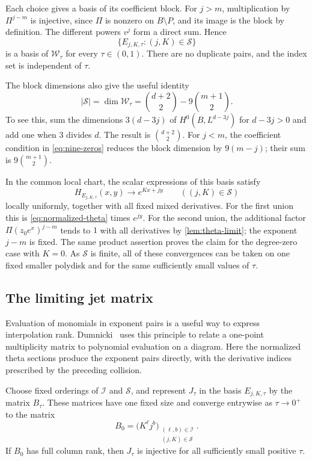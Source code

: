 Each choice gives a basis of its coefficient block. For $j>m$, multiplication by $\Pi^{j-m}$ is injective, since $\Pi$ is nonzero on $B\setminus P$, and its image is the block by definition. The different powers $v^j$ form a direct sum. Hence
\[
 \{E_{j,K,\tau}:(j,K)\in\mathcal{S}\}
\]
is a basis of $\mathcal{W}_\tau$ for every $\tau\in(0,1)$. There are no duplicate pairs, and the index set is independent of $\tau$.

The block dimensions also give the useful identity
\[
 |\mathcal{S}|=\dim\mathcal{W}_\tau
 =\binom{d+2}{2}-9\binom{m+1}{2}.
\]
To see this, sum the dimensions $3(d-3j)$ of $H^0(B,L^{d-3j})$ for $d-3j>0$ and add one when $3$ divides $d$. The result is $\binom{d+2}{2}$. For $j<m$, the coefficient condition in \eqref{eq:nine-zeros} reduces the block dimension by $9(m-j)$; their sum is $9\binom{m+1}{2}$.

In the common local chart, the scalar expressions of this basis satisfy
\[
 H_{E_{j,K,\tau}}(x,y)\longrightarrow e^{Kx+jy}
 \qquad((j,K)\in\mathcal{S})
\]
locally uniformly, together with all fixed mixed derivatives. For the first union this is \eqref{eq:normalized-theta} times $e^{jy}$. For the second union, the additional factor $\Pi(z_0e^x)^{j-m}$ tends to $1$ with all derivatives by \cref{lem:theta-limit}; the exponent $j-m$ is fixed. The same product assertion proves the claim for the degree-zero case with $K=0$. As $\mathcal{S}$ is finite, all of these convergences can be taken on one fixed smaller polydisk and for the same sufficiently small values of $\tau$.

\subsection{The limiting jet matrix}

Evaluation of monomials in exponent pairs is a useful way to express interpolation rank. Dumnicki~\cite[proof of Proposition~13]{Dumnicki2007} uses this principle to relate a one-point multiplicity matrix to polynomial evaluation on a diagram. Here the normalized theta sections produce the exponent pairs directly, with the derivative indices prescribed by the preceding collision.

\begin{proposition}
\label{prop:matrix-limit}
Choose fixed orderings of $\mathcal{I}$ and $\mathcal{S}$, and represent $J_\tau$ in the basis $E_{j,K,\tau}$ by the matrix $B_\tau$. These matrices have one fixed size and converge entrywise as $\tau\to0^+$ to the matrix
\begin{equation}
 B_0=\bigl(K^\ell j^b\bigr)_
              {\substack{(\ell,b)\in\mathcal{I}\\ (j,K)\in\mathcal{S}}}.
 \label{eq:limiting-matrix}
\end{equation}
If $B_0$ has full column rank, then $J_\tau$ is injective for all sufficiently small positive $\tau$.
\end{proposition}

